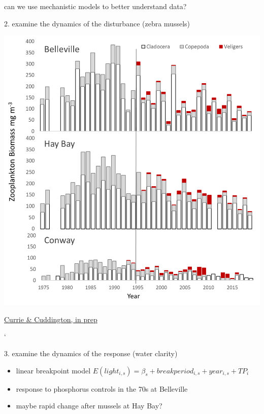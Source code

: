 \documentclass[
  ignorenonframetext,
]{beamer}
\providecommand{\tightlist}{%
  \setlength{\itemsep}{0pt}\setlength{\parskip}{0pt}}
\begin{document}
\begin{frame}{can we use mechanistic models to better understand data?}
\begin{block}{2. examine the dynamics of the disturbance (zebra
mussels)}
\begin{center}\includegraphics[width=0.8\linewidth]{zoobar} \end{center}

\href{}{Currie \& Cuddington, in prep}

`
\end{block}

\begin{block}{3. examine the dynamics of the response (water clarity)}
\protect\hypertarget{margins}{}
\begin{itemize}
\tightlist
\item
  linear breakpoint model
  \(E(light_{i,s}) = \beta_s+break period_{i,s} + year_{i,s} + TP_i\)
\item
  response to phosphorus controls in the 70s at Belleville
\item
  maybe rapid change after mussels at Hay Bay?
\end{itemize}


\end{block}
\end{frame}
\end{document}
